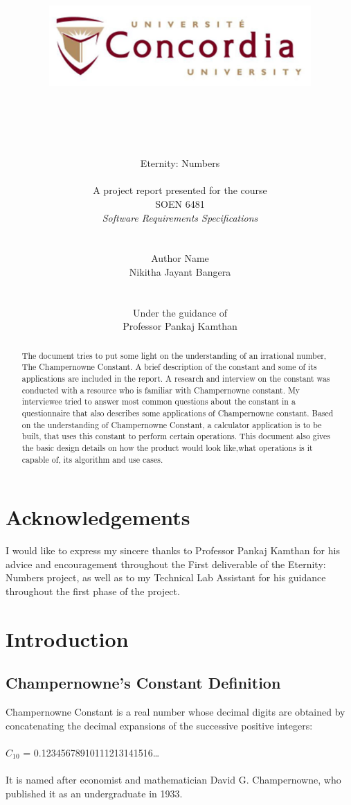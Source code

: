 \documentclass[12pt, a4paper]{report}
\date{}
\title{\includegraphics[width=10cm,height=5cm]{Con_Logo1.jpg}\\\\}
\author{
\LARGE{Eternity: Numbers}
\\\\
A project report presented for the course\\ 
SOEN 6481 \\\textit{Software Requirements Specifications}
\\ \\ 
\\ \Large{Author Name}
\\ Nikitha Jayant Bangera
\\\\ \\
Under the guidance of\\
Professor Pankaj Kamthan
}
\begin{document}
\thispagestyle{headings}
	\maketitle
{}

\thispagestyle{empty}
\chapter*{Acknowledgements}
I would like to express my sincere thanks to Professor Pankaj Kamthan for his advice and encouragement throughout the First deliverable of the Eternity: Numbers project, as well as to my Technical Lab Assistant for his guidance throughout the first phase of the project. 
\thispagestyle{empty}
\begin{abstract}
The document tries to put some light on the understanding of an irrational number, The Champernowne Constant. A brief description of the constant and some of its applications are included in the report. A research and interview on the constant was conducted with a resource who is familiar with Champernowne constant. My interviewee tried to answer most common questions about the constant in a questionnaire that also describes some applications of Champernowne constant. Based on the understanding of Champernowne Constant, a calculator application is to be built, that uses this constant to perform certain operations. This document also gives the basic design details on how the product would look like,what operations is it capable of, its algorithm and use cases.
\end{abstract}

\tableofcontents
\thispagestyle{plain}
\listoffigures
\listoftables

\chapter{Introduction}
\section{Champernowne's Constant Definition}
\quad Champernowne Constant is a real number whose decimal digits are obtained by concatenating the decimal expansions of the successive positive integers:\\\\
\hspace*{30mm} $C_{10}$ = 0.12345678910111213141516…\\\\
It is named after economist and mathematician David G. Champernowne, who published it as an undergraduate in 1933.\\
\end{document}
